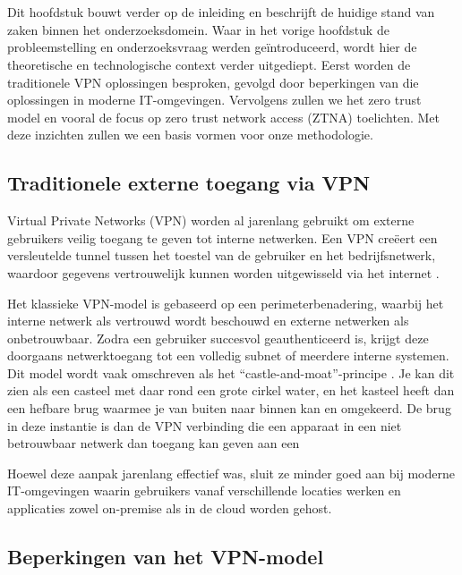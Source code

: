 \chapter{}%
\label{ch:stand-van-zaken}

Dit hoofdstuk bouwt verder op de inleiding en beschrijft de huidige stand van zaken binnen het onderzoeksdomein. Waar in het vorige hoofdstuk de probleemstelling en onderzoeksvraag werden geïntroduceerd, wordt hier de theoretische en technologische context verder uitgediept. Eerst worden de traditionele VPN oplossingen besproken, gevolgd door beperkingen van die oplossingen in moderne IT-omgevingen. Vervolgens zullen we het zero trust model en vooral de focus op zero trust network access (ZTNA)  toelichten. Met deze inzichten zullen we een basis vormen voor onze  methodologie.

\section{Traditionele externe toegang via VPN}

Virtual Private Networks (VPN) worden al jarenlang gebruikt om externe gebruikers veilig toegang te geven tot interne netwerken. Een VPN creëert een versleutelde tunnel tussen het toestel van de gebruiker en het bedrijfsnetwerk, waardoor gegevens vertrouwelijk kunnen worden uitgewisseld via het internet \autocite{barracuda2024}.

Het klassieke VPN-model is gebaseerd op een perimeterbenadering, waarbij het interne netwerk als vertrouwd wordt beschouwd en externe netwerken als onbetrouwbaar. Zodra een gebruiker succesvol geauthenticeerd is, krijgt deze doorgaans netwerktoegang tot een volledig subnet of meerdere interne systemen. Dit model wordt vaak omschreven als het “castle-and-moat”-principe \autocite{nflo2025}. Je kan dit zien als een casteel met daar rond een grote cirkel water, en het kasteel heeft dan een hefbare brug waarmee je van buiten naar binnen kan en omgekeerd. De brug in deze instantie is dan de VPN verbinding die een apparaat in een niet betrouwbaar netwerk dan toegang kan geven aan een 

Hoewel deze aanpak jarenlang effectief was, sluit ze minder goed aan bij moderne IT-omgevingen waarin gebruikers vanaf verschillende locaties werken en applicaties zowel on-premise als in de cloud worden gehost.

\section{Beperkingen van het VPN-model}

